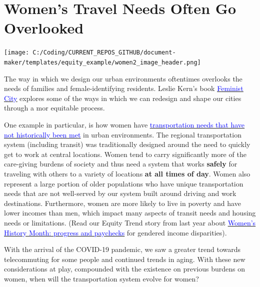 \documentclass[
  12pt,
]{article}
\author{}
\date{\vspace{-2.5em}}
\begin{document}
\hypertarget{womens-travel-needs-often-go-overlooked}{%
\section{Women's Travel Needs Often Go
Overlooked}\label{womens-travel-needs-often-go-overlooked}}

\texttt{[image: C:/Coding/CURRENT\_REPOS\_GITHUB/document-maker/templates/equity\_example/women2\_image\_header.png]}

\begin{flushleft}
The way in which we design our urban environments oftentimes overlooks the needs of families and female-identifying residents. Leslie Kern's book \href{https://metropolismag.com/viewpoints/leslie-kern-feminist-city/}{\underline{\textcolor{blue}{Feminist City}}} explores some of the ways in which we can redesign and shape our cities through a mor equitable process. \smallskip

One example in particular, is how women have \href{http://libraryarchives.metro.net/DB_Attachments/2019-0294/UnderstandingHowWomenTravel_FullReport_FINAL.pdf}{\underline{\textcolor{blue}{transportation needs that have not historically been met}}} in urban environments. The regional transportation system (including transit) was traditionally designed around the need to quickly get to work at central locations. Women tend to carry significantly more of the care-giving burdens of society and thus need a system that works \textbf{safely} for traveling with others to a variety of locations \textbf{at all times of day}. Women also represent a large portion of older populations who have unique transportation needs that are not well-served by our system built around driving and work destinations. Furthermore, women are more likely to live in poverty and have lower incomes than men, which impact many aspects of transit needs and housing needs or limitations. (Read our Equity Trend story from last year about \href{https://www.psrc.org/about-us/media-hub/womens-history-month-progress-and-paychecks}{\underline{\textcolor{blue}{Women's History Month: progress and paychecks}}} for gendered income disparities). \smallskip

With the arrival of the COVID-19 pandemic, we saw a greater trend towards telecommuting for some people and continued trends in aging. With these new considerations at play, compounded with the existence on previous burdens on women, when will the transportation system evolve for women?
\end{flushleft}
\end{document}
